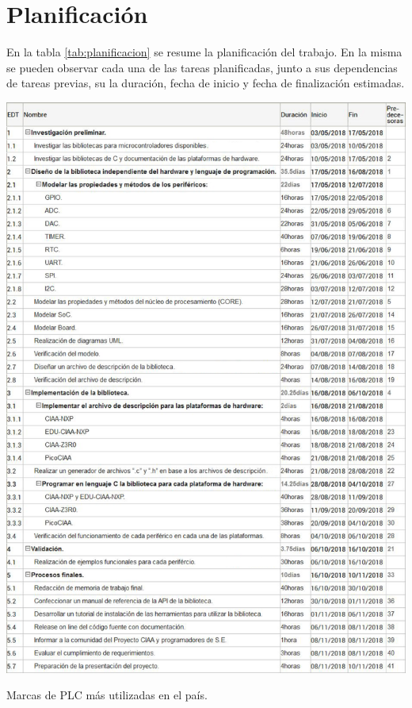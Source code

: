 \section{Planificación}
\label{sec:planificacion}

En la tabla \ref{tab:planificacion} se resume la planificación del trabajo. En la misma se pueden observar cada una de las tareas planificadas, junto a sus dependencias de tareas previas, su la duración, fecha de inicio y fecha de finalización estimadas.

\begin{table}[!htbp]
\begin{center}

\includegraphics*{Figures/Gantt.png}

\par\caption{Marcas de PLC más utilizadas en el país.}\label{tab:planificacion}
\end{center}
\end{table}